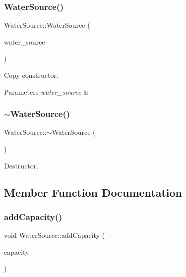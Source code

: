 \subsubsection{\texorpdfstring{Water\+Source()}{WaterSource()}\hspace{0.1cm}{\footnotesize\ttfamily [6/6]}}
{\footnotesize\ttfamily Water\+Source\+::\+Water\+Source (\begin{DoxyParamCaption}\item[{const \mbox{\hyperlink{classWaterSource}{Water\+Source}} \&}]{water\+\_\+source }\end{DoxyParamCaption})}

Copy constructor. 
\begin{DoxyParams}{Parameters}
{\em water\+\_\+source} & \\
\hline
\end{DoxyParams}
\mbox{\label{classWaterSource_a48d9be2deccd87e1d1cdcbb4b2df83cf_a48d9be2deccd87e1d1cdcbb4b2df83cf}} 
\subsubsection{\texorpdfstring{$\sim$\+Water\+Source()}{~WaterSource()}}
{\footnotesize\ttfamily Water\+Source\+::$\sim$\+Water\+Source (\begin{DoxyParamCaption}{ }\end{DoxyParamCaption})\hspace{0.3cm}{\ttfamily [virtual]}}

Destructor. 

\subsection{Member Function Documentation}
\mbox{\label{classWaterSource_abffedb6e58620b1b1d6f3c4b4480d3a0_abffedb6e58620b1b1d6f3c4b4480d3a0}} 
\subsubsection{\texorpdfstring{add\+Capacity()}{addCapacity()}}
{\footnotesize\ttfamily void Water\+Source\+::add\+Capacity (\begin{DoxyParamCaption}\item[{double}]{capacity }\end{DoxyParamCaption})\hspace{0.3cm}{\ttfamily [virtual]}}



